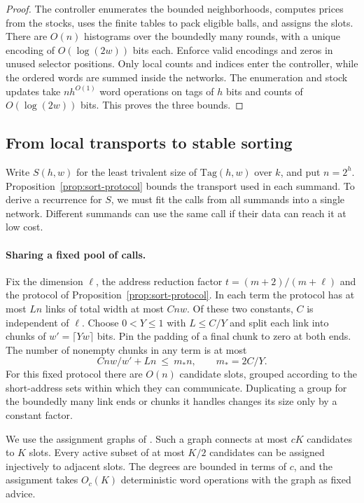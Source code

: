 \begin{proof}
The controller enumerates the bounded neighborhoods, computes prices
from the stocks, uses the finite tables to pack eligible balls, and
assigns the slots. There are $O(n)$ histograms over the boundedly
many rounds, with a unique encoding of $O(\log(2w))$ bits each.
Enforce valid encodings and zeros in unused selector positions.
Only local counts and indices enter the controller, while the ordered
words are summed inside the networks. The enumeration and stock
updates take $nh^{O(1)}$ word operations on tags of $h$ bits and
counts of $O(\log(2w))$ bits. This proves the three bounds.
\end{proof}

\subsection{From local transports to stable sorting}
\label{subsec:sort-recursion}

Write $S(h,w)$ for the least trivalent size of $\mathrm{Tag}(h,w)$
over $k$, and put $n=2^h$. Proposition~\ref{prop:sort-protocol} bounds
the transport used in each summand. To derive a recurrence for $S$,
we must fit the calls from all summands into a single network.
Different summands can use the same call if their data can reach it
at low cost.

\paragraph{Sharing a fixed pool of calls.}
Fix the dimension $\ell$, the address reduction factor
$t=(m+2)/(m+\ell)$ and the protocol of Proposition~\ref{prop:sort-protocol}.
In each term the protocol has at most $Ln$ links of total width at most
$Cnw$. Of these two constants, $C$ is independent of $\ell$.
Choose $0<Y\le1$ with $L\le C/Y$ and split each link into chunks of
$w'=\lceil Yw\rceil$ bits. Pin the padding of a final chunk to zero
at both ends. The number of nonempty chunks in any term is at most
\[
             Cnw/w'+Ln\ \le\ m_*n,\qquad m_*=2C/Y .
\]
For this fixed protocol there are $O(n)$ candidate slots, grouped
according to the short-address sets within which they can communicate.
Duplicating a group for the boundedly many link ends or chunks it
handles changes its size only by a constant factor.

We use the assignment graphs of
\cite[Lemma~]{oaG}. Such a graph connects
at most $cK$ candidates to $K$ slots. Every active subset of at most
$K/2$ candidates can be assigned injectively to adjacent slots.
The degrees are bounded in terms of $c$, and the assignment takes
$O_c(K)$ deterministic word operations with the graph as fixed advice.

